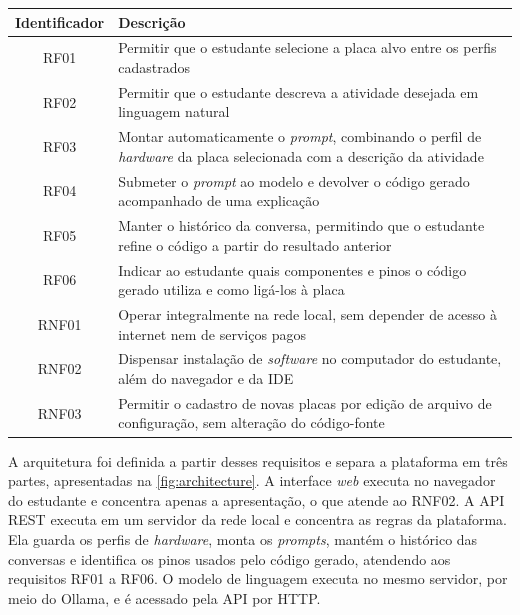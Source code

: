 \begin{quadro}[!htb]
  \centering
  \caption{Requisitos funcionais e não funcionais da plataforma}
  \label{qua:requirements}
  \begin{tabularx}{\textwidth}{|c|X|}
    \hline
    \textbf{Identificador} & \textbf{Descrição} \\
    \hline
    RF01 & Permitir que o estudante selecione a placa alvo entre os perfis cadastrados \\
    \hline
    RF02 & Permitir que o estudante descreva a atividade desejada em linguagem natural \\
    \hline
    RF03 & Montar automaticamente o \textit{prompt}, combinando o perfil de \textit{hardware} da placa selecionada com a descrição da atividade \\
    \hline
    RF04 & Submeter o \textit{prompt} ao modelo e devolver o código gerado acompanhado de uma explicação \\
    \hline
    RF05 & Manter o histórico da conversa, permitindo que o estudante refine o código a partir do resultado anterior \\
    \hline
    RF06 & Indicar ao estudante quais componentes e pinos o código gerado utiliza e como ligá-los à placa \\
    \hline
    RNF01 & Operar integralmente na rede local, sem depender de acesso à internet nem de serviços pagos \\
    \hline
    RNF02 & Dispensar instalação de \textit{software} no computador do estudante, além do navegador e da IDE \\
    \hline
    RNF03 & Permitir o cadastro de novas placas por edição de arquivo de configuração, sem alteração do código-fonte \\
    \hline
  \end{tabularx}
\end{quadro}

A arquitetura foi definida a partir desses requisitos e separa a plataforma em três partes, apresentadas na \autoref{fig:architecture}. A interface \textit{web} executa no navegador do estudante e concentra apenas a apresentação, o que atende ao RNF02. A API REST executa em um servidor da rede local e concentra as regras da plataforma. Ela guarda os perfis de \textit{hardware}, monta os \textit{prompts}, mantém o histórico das conversas e identifica os pinos usados pelo código gerado, atendendo aos requisitos RF01 a RF06. O modelo de linguagem executa no mesmo servidor, por meio do Ollama, e é acessado pela API por HTTP.

